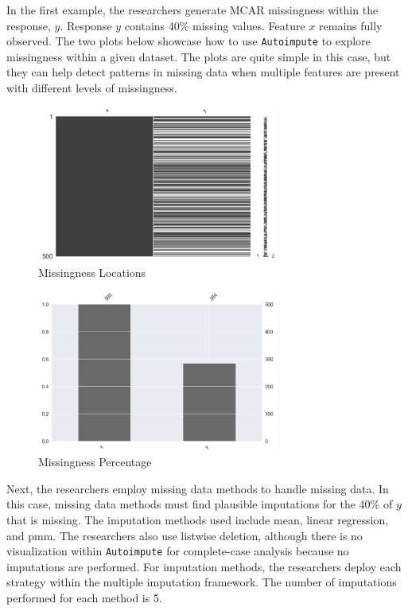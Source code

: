 \documentclass[12pt,oneside]{chicagocapstone}
\begin{document}
In the first example, the researchers generate MCAR missingness within
the response, \(y\). Response \(y\) contains 40\% missing values.
Feature \(x\) remains fully observed. The two plots below showcase how
to use \texttt{Autoimpute} to explore missingness within a given
dataset. The plots are quite simple in this case, but they can help
detect patterns in missing data when multiple features are present with
different levels of missingness.
\begin{figure}

{\centering \includegraphics[width=300px]{figure/y-mis-forty-loc} 

}

\caption{Missingness Locations}\label{fig:y-mis-forty-loc}
\end{figure}
\begin{figure}

{\centering \includegraphics[width=300px]{figure/y-mis-forty-bar} 

}

\caption{Missingness Percentage}\label{fig:y-mis-forty-bar}
\end{figure}
Next, the researchers employ missing data methods to handle missing
data. In this case, missing data methods must find plausible imputations
for the 40\% of \(y\) that is missing. The imputation methods used
include mean, linear regression, and pmm. The researchers also use
listwise deletion, although there is no visualization within
\texttt{Autoimpute} for complete-case analysis because no imputations
are performed. For imputation methods, the researchers deploy each
strategy within the multiple imputation framework. The number of
imputations performed for each method is 5.
\end{document}
